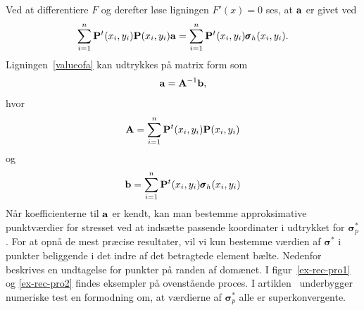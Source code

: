 Ved at differentiere $F$ og derefter løse ligningen $F'(x)=0$ ses, at
${\bf a}$ er givet ved
\begin{equation} \label{valueofa}
  \sum_{i=1}^n {\bf P}^t(x_i,y_i){\bf P}(x_i,y_i){\bf a} =
  \sum_{i=1}^n {\bf P}^t(x_i,y_i)\pmb{\sigma}_h (x_i,y_i).
\end{equation} 
Ligningen~\eqref{valueofa} kan udtrykkes på matrix form som
\begin{equation}
  {\bf a} = {\bf A}^{-1}{\bf b},
\end{equation}
hvor
\begin{equation}
  {\bf A} = \sum_{i=1}^n {\bf P}^t(x_i,y_i){\bf P}(x_i,y_i)
\end{equation}
og
\begin{equation}
  {\bf b} = \sum_{i=1}^n {\bf P}^t(x_i,y_i)\pmb{\sigma}_h (x_i,y_i)
\end{equation}	    
Når koefficienterne til ${\bf a}$ er kendt, kan man bestemme
approksimative punktværdier for stresset ved at indsætte passende
koordinater i udtrykket for $\pmb{\sigma}^{\ast}_p$. For at opnå
de mest præcise resultater, vil vi kun bestemme værdien af $\pmb{\sigma}^{\ast}$ i
punkter beliggende i det indre af det betragtede element bælte.
Nedenfor beskrives en undtagelse for punkter på randen af domænet. I
figur~\ref{ex-rec-pro1} og \ref{ex-rec-pro2} findes eksempler på
ovenstående proces. I artiklen~\cite{zz3} underbygger numeriske test
en formodning om, at værdierne af $\pmb{\sigma}^{\ast}_p$ alle er
superkonvergente.  


